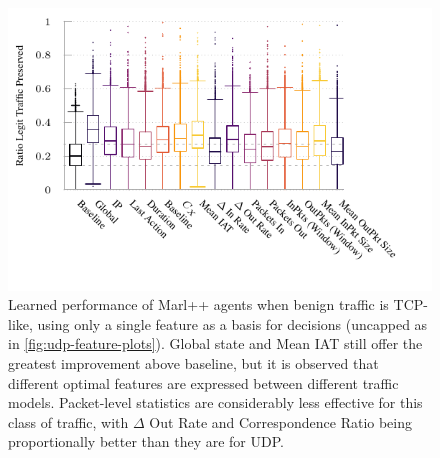 \documentclass[conference, a4paper, 10pt, times]{IEEEtran}
\begin{document}
\begin{figure}
	\centering
	\includegraphics[width=\linewidth]{../plots/ftprep-tcp-box}
	\vspace{-1.2cm}
	\caption{
		Learned performance of Marl++ agents when benign traffic is TCP-like, using only a single feature as a basis for decisions (uncapped as in \cref{fig:udp-feature-plots}).
		Global state and Mean IAT still offer the greatest improvement above baseline, but it is observed that different optimal features are expressed between different traffic models.
		Packet-level statistics are considerably less effective for this class of traffic, with $\Delta$ Out Rate and Correspondence Ratio being proportionally better than they are for UDP.
		\label{fig:tcp-feature-plots}
	}
\end{figure}
\end{document}
